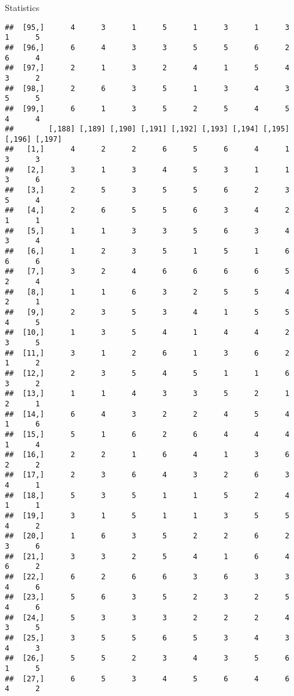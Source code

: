 \documentclass[
  ignorenonframetext,
]{beamer}
\begin{document}
\begin{frame}[fragile]{Statistics}
\begin{verbatim}
##  [95,]      4      3      1      5      1      3      1      3      1      5
##  [96,]      6      4      3      3      5      5      6      2      6      4
##  [97,]      2      1      3      2      4      1      5      4      3      2
##  [98,]      2      6      3      5      1      3      4      3      5      5
##  [99,]      6      1      3      5      2      5      4      5      4      4
##        [,188] [,189] [,190] [,191] [,192] [,193] [,194] [,195] [,196] [,197]
##   [1,]      4      2      2      6      5      6      4      1      3      3
##   [2,]      3      1      3      4      5      3      1      1      3      6
##   [3,]      2      5      3      5      5      6      2      3      5      4
##   [4,]      2      6      5      5      6      3      4      2      1      1
##   [5,]      1      1      3      3      5      6      3      4      3      4
##   [6,]      1      2      3      5      1      5      1      6      6      6
##   [7,]      3      2      4      6      6      6      6      5      2      4
##   [8,]      1      1      6      3      2      5      5      4      2      1
##   [9,]      2      3      5      3      4      1      5      5      4      5
##  [10,]      1      3      5      4      1      4      4      2      3      5
##  [11,]      3      1      2      6      1      3      6      2      1      2
##  [12,]      2      3      5      4      5      1      1      6      3      2
##  [13,]      1      1      4      3      3      5      2      1      2      1
##  [14,]      6      4      3      2      2      4      5      4      1      6
##  [15,]      5      1      6      2      6      4      4      4      1      4
##  [16,]      2      2      1      6      4      1      3      6      2      2
##  [17,]      2      3      6      4      3      2      6      3      4      1
##  [18,]      5      3      5      1      1      5      2      4      1      1
##  [19,]      3      1      5      1      1      3      5      5      4      2
##  [20,]      1      6      3      5      2      2      6      2      3      6
##  [21,]      3      3      2      5      4      1      6      4      6      2
##  [22,]      6      2      6      6      3      6      3      3      4      6
##  [23,]      5      6      3      5      2      3      2      5      4      6
##  [24,]      5      3      3      3      2      2      2      4      3      5
##  [25,]      3      5      5      6      5      3      4      3      4      3
##  [26,]      5      5      2      3      4      3      5      6      1      5
##  [27,]      6      5      3      4      5      6      4      6      4      2

\end{verbatim}
\end{frame}
\end{document}
